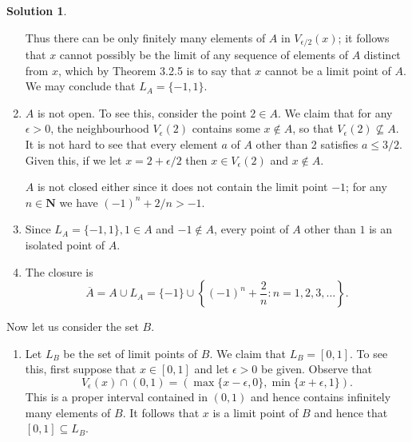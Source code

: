 \documentclass[12pt]{article}
\theoremstyle{definition}
\theoremstyle{exercise}
\theoremstyle{solution}
\newtheorem*{solution}{Solution}
\newcommand{\N}{\mathbf{N}}
\begin{document}
\begin{solution}
\begin{enumerate}
\begin{figure}[h]
        \end{figure}

        Thus there can be only finitely many elements of \( A \) in \( V_{\epsilon/2}(x) \); it follows that \( x \) cannot possibly be the limit of any sequence of elements of \( A \) distinct from \( x \), which by Theorem 3.2.5 is to say that \( x \) cannot be a limit point of \( A \). We may conclude that \( L_A = \{ -1, 1 \} \).

        \item \( A \) is not open. To see this, consider the point \( 2 \in A \). We claim that for any \( \epsilon > 0 \), the neighbourhood \( V_{\epsilon}(2) \) contains some \( x \not\in A \), so that \( V_{\epsilon}(2) \not\subseteq A \). It is not hard to see that every element \( a \) of \( A \) other than 2 satisfies \( a \leq 3/2 \). Given this, if we let \( x = 2 + \epsilon / 2 \) then \( x \in V_{\epsilon}(2) \) and \( x \not\in A \).

        \( A \) is not closed either since it does not contain the limit point \( -1 \); for any \( n \in \N \) we have \( (-1)^n + 2 / n > -1 \).

        \item Since \( L_A = \{ -1, 1 \}, 1 \in A \) and \( -1 \not\in A \), every point of \( A \) other than \( 1 \) is an isolated point of \( A \).

        \item The closure is
        \[
            \overline{A} = A \cup L_A = \{ -1 \} \cup \left\{ (-1)^n + \frac{2}{n} : n = 1, 2, 3, \ldots \right\}.
        \]
    \end{enumerate}

    Now let us consider the set \( B \).
    \begin{enumerate}
        \item Let \( L_B \) be the set of limit points of \( B \). We claim that \( L_B = [0, 1] \). To see this, first suppose that \( x \in [0, 1] \) and let \( \epsilon > 0 \) be given. Observe that
        \[
            V_{\epsilon}(x) \cap (0, 1) = (\max \{ x - \epsilon, 0 \}, \min \{ x + \epsilon, 1 \}).
        \]
        This is a proper interval contained in \( (0, 1) \) and hence contains infinitely many elements of \( B \). It follows that \( x \) is a limit point of \( B \) and hence that \( [0, 1] \subseteq L_B \).
        

\end{enumerate}
\end{solution}
\end{document}
